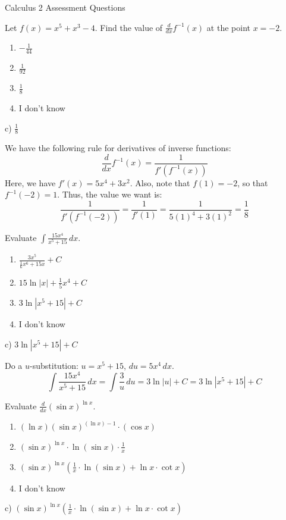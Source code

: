 \documentclass[addpoints,12pt,answers]{exam}
\begin{document}
\begin{center}
Calculus 2 Assessment Questions
\end{center}

\begin{questions}
  \question
  Let $f(x)=x^5+x^3-4$. Find the value of $\displaystyle\frac{d}{dx}f^{-1}(x)$ at the point $x=-2$.
  \begin{enumerate}[label=\alph*)]
    \item
    $\displaystyle-\frac{1}{44}$
    \item
    $\displaystyle\frac{1}{92}$
    \item
    $\displaystyle\frac{1}{8}$
    \item
    I don't know
  \end{enumerate}
  \begin{solution}
    c) $\displaystyle\frac{1}{8}$
    
    We have the following rule for derivatives of inverse functions:
    $$\frac{d}{dx}f^{-1}(x)=\frac{1}{f'(f^{-1}(x))}$$
    Here, we have $f'(x)=5x^4+3x^2$. Also, note that $f(1)=-2$, so that $f^{-1}(-2)=1$. Thus, the value we want is:
    $$\frac{1}{f'(f^{-1}(-2))}=\frac{1}{f'(1)}=\frac{1}{5(1)^4+3(1)^2}=\frac{1}{8}$$
  \end{solution}
  \newpage
  \question
  Evaluate $\displaystyle\int\frac{15x^4}{x^5+15}\,dx$.
  \begin{enumerate}[label=\alph*)]
    \item
    $\displaystyle\frac{3x^5}{\frac{1}{6}x^6+15x}+C$
    \item
    $\displaystyle 15\ln|x|+\frac{1}{5}x^4+C$
    \item
    $3\ln|x^5+15|+C$
    \item
    I don't know
  \end{enumerate}
  \begin{solution}
    c) $3\ln|x^5+15|+C$
    
    Do a $u$-substitution: $u=x^5+15$, $du=5x^4\,dx$.
    $$\int\frac{15x^4}{x^5+15}\,dx=\int\frac{3}{u}\,du=3\ln|u|+C=3\ln|x^5+15|+C$$
  \end{solution}
  \newpage
  \question
  Evaluate $\displaystyle\frac{d}{dx}(\sin x)^{\ln x}$.
  \begin{enumerate}[label=\alph*)]
    \item
    $\displaystyle(\ln x)(\sin x)^{(\ln x)-1}\cdot(\cos x)$
    \item
    $\displaystyle(\sin x)^{\ln x}\cdot\ln(\sin x)\cdot\frac{1}{x}$
    \item
    $\displaystyle(\sin x)^{\ln x}\left(\frac{1}{x}\cdot\ln(\sin x)+\ln x\cdot\cot x\right)$
    \item
    I don't know
  \end{enumerate}
  \begin{solution}
    c) $\displaystyle(\sin x)^{\ln x}\left(\frac{1}{x}\cdot\ln(\sin x)+\ln x\cdot\cot x\right)$
    

\end{solution}
\end{questions}
\end{document}

